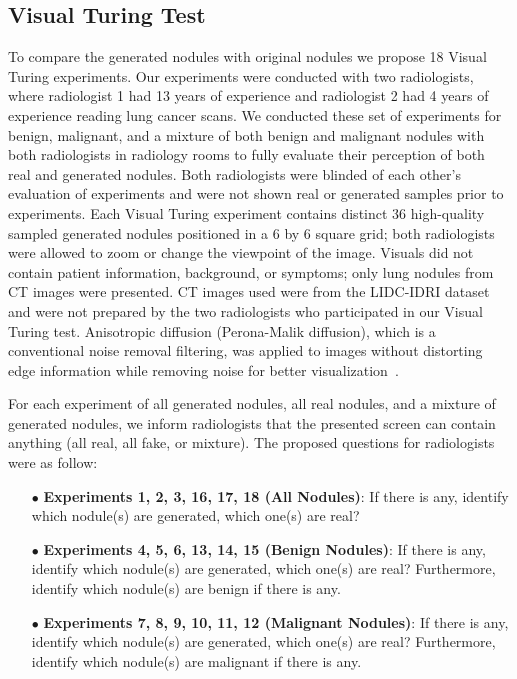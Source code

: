 \documentclass{article}
\begin{document}
\subsection{Visual Turing Test}
To compare the generated nodules with original nodules we propose 18 Visual Turing experiments. Our experiments were conducted with two radiologists, where radiologist 1 had 13 years of experience and radiologist 2 had 4 years of experience reading lung cancer scans. We conducted these set of experiments for benign, malignant, and a mixture of both benign and malignant nodules with both radiologists in radiology rooms to fully evaluate their perception of both real and generated nodules. Both radiologists were blinded of each other's evaluation of experiments and were not shown real or generated samples prior to experiments. Each Visual Turing experiment contains distinct 36 high-quality sampled generated nodules positioned in a 6 by 6 square grid; both radiologists were allowed to zoom or change the viewpoint of the image. Visuals did not contain patient information, background, or symptoms; only lung nodules from CT images were presented. CT images used were from the LIDC-IDRI dataset and were not prepared by the two radiologists who participated in our Visual Turing test. Anisotropic diffusion (Perona-Malik diffusion), which is a conventional noise removal filtering, was applied to images without distorting edge information while removing noise for better visualization~\cite{perona1990scale}. 
  
For each experiment of all generated nodules, all real nodules, and a mixture of generated nodules, we inform radiologists that the presented screen can contain anything (all real, all fake, or mixture). The proposed questions for radiologists were as follow:

\begin{itemize}
\item[$\bullet$] \textbf{Experiments 1, 2, 3, 16, 17, 18 (All Nodules)}: If there is any, identify which nodule(s) are generated, which one(s) are real? 
\item[$\bullet$] \textbf{Experiments 4, 5, 6, 13, 14, 15 (Benign Nodules)}: If there is any, identify which nodule(s) are generated, which one(s) are real?  Furthermore, identify which nodule(s) are benign if there is any.
\item[$\bullet$] \textbf{Experiments 7, 8, 9, 10, 11, 12 (Malignant Nodules)}: If there is any, identify which nodule(s) are generated, which one(s) are real? Furthermore, identify which nodule(s) are malignant if there is any.
\end{itemize}
\end{document}
